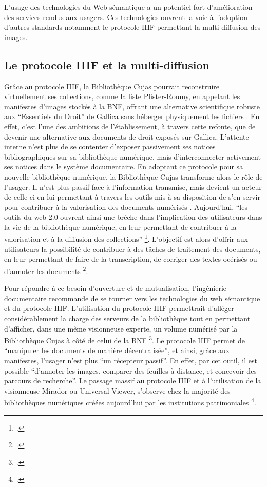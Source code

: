 L'usage des technologies du Web sémantique a un potentiel fort d'amélioration des services rendus aux usagers. Ces technologies ouvrent la voie à l'adoption d'autres standards notamment le protocole \ac{IIIF} permettant la multi-diffusion des images. 

\subsection{Le protocole IIIF et la multi-diffusion}
Grâce au protocole \ac{IIIF}, la Bibliothèque Cujas pourrait reconstruire virtuellement ses collections, comme la liste Pfister-Roumy, en appelant les manifestes d'images stockés à la \ac{BNF}, offrant une alternative scientifique robuste aux \enquote{Essentiels du Droit} de Gallica sans héberger physiquement les fichiers . En effet, c'est l'une des ambitions de l'établissement, à travers cette refonte, que de devenir une alternative aux documents de droit exposés sur Gallica. L'attente interne n'est plus de se contenter d'exposer passivement ses notices bibliographiques sur sa bibliothèque numérique, mais d'interconnecter activement ses notices dans le système documentaire. En adoptant ce protocole pour sa nouvelle bibliothèque numérique, la Bibliothèque Cujas transforme alors le rôle de l'usager. Il n'est plus passif face à l'information transmise, mais devient un acteur de celle-ci en lui permettant à travers les outils mis à sa disposition de s'en servir pour contribuer à la valorisation des documents numérisés . Aujourd'hui, \enquote{les outils du web 2.0 ouvrent ainsi une brèche dans l'implication des utilisateurs dans la vie de la bibliothèque numérique, en leur permettant de contribuer à la valorisation et à la diffusion des collections} \footcite{dipietroProduireContenusDocumentaires2014}. L'objectif est alors d'offrir aux utilisateurs la possibilité de contribuer à des tâches de traitement des documents, en leur permettant de faire de la transcription, de corriger des textes océrisés ou d'annoter les documents \footcite{leblancBibliothequesNumeriquesEnrichies}.

Pour répondre à ce besoin d'ouverture et de mutualisation, l'ingénierie documentaire recommande de se tourner vers les technologies du web sémantique et du protocole \ac{IIIF}. L'utilisation du protocole \ac{IIIF} permettrait d'alléger considérablement la charge des serveurs de la bibliothèque tout en permettant d'afficher, dans une même visionneuse experte, un volume numérisé par la Bibliothèque Cujas à côté de celui de la \ac{BNF} \footcite{pasquierIIIFSolutionOuverte2024}. Le protocole \ac{IIIF} permet de \enquote{manipuler les documents de manière décentralisée}, et ainsi, grâce aux manifestes, l'usager n'est plus \enquote{un récepteur passif}. En effet, par cet outil, il est possible \enquote{d'annoter les images, comparer des feuilles à distance, et concevoir des parcours de recherche}. Le passage massif au protocole \ac{IIIF} et à l'utilisation de la visionneuse Mirador ou Universal Viewer, s'observe chez la majorité des bibliothèques numériques créées aujourd'hui par les institutions patrimoniales \footcite{pasquierIIIFSolutionOuverte2024}. 

